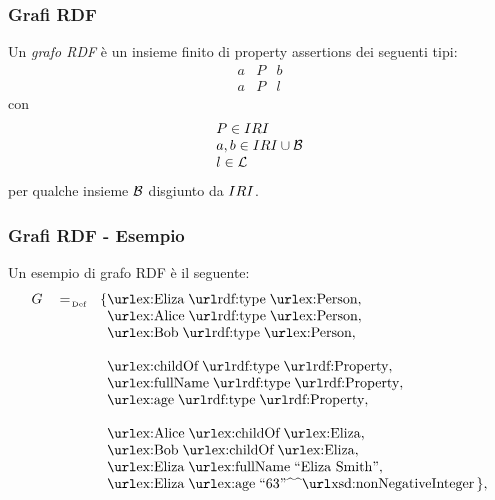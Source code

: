 \documentclass[8pt]{beamer}
\begin{document}
\begin{frame}
 \frametitle{Grafi RDF}
 Un \emph{grafo RDF} \`e un insieme finito di property assertions dei seguenti tipi:
\[
 \begin{array}{rcl}
  a & P & b \\
  a & P & l
 \end{array}
\]
con 
\[
 \begin{array}{l}
 P \in IRI\\
 a, b \in IRI \cup \mathcal{B}\\
 l \in \mathcal{L}
 \end{array}
\]
per qualche insieme $\mathcal{B}$ disgiunto da $IRI$.
\vspace{\baselineskip}

\end{frame}

\newcommand{\triple}[3]{\mathurl{#1}\;\mathurl{#2}\;#3}
\newcommand{\tripleO}[3]{\mathurl{#1}\;\mathurl{#2}\;\mathurl{#3}}

\begin{frame}
 \frametitle{Grafi RDF - Esempio}
 Un esempio di grafo RDF \`e il seguente:
 \[
 \begin{array}{rcl}
  G & \defAs & \{ \tripleO{ex:Eliza}{rdf:type}{ex:Person},\\
  &&\phantom{\{} \tripleO{ex:Alice}{rdf:type}{ex:Person},\\
  &&\phantom{\{} \tripleO{ex:Bob}{rdf:type}{ex:Person},\\
  \\
  &&\phantom{\{} \tripleO{ex:childOf}{rdf:type}{rdf:Property},\\
  &&\phantom{\{} \tripleO{ex:fullName}{rdf:type}{rdf:Property},\\
  &&\phantom{\{} \tripleO{ex:age}{rdf:type}{rdf:Property},\\
  \\
  &&\phantom{\{} \tripleO{ex:Alice}{ex:childOf}{ex:Eliza},\\
  &&\phantom{\{} \tripleO{ex:Bob}{ex:childOf}{ex:Eliza},\\
  &&\phantom{\{} \triple{ex:Eliza}{ex:fullName}{\stringLiteral{Eliza Smith}},\\
  &&\phantom{\{} \triple{ex:Eliza}{ex:age}{\literal{63}{xsd:nonNegativeInteger}} \,\},\\
 \end{array}
\]
\end{frame}
\end{document}
